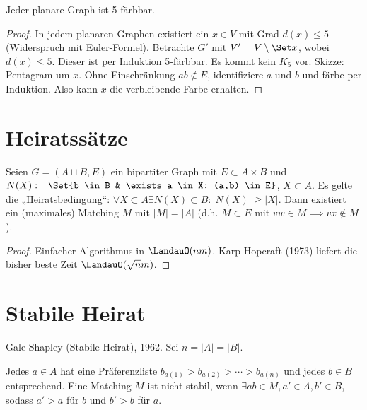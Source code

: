 \begin{st}
    Jeder planare Graph ist 5-färbbar.
    \begin{proof}
        In jedem planaren Graphen existiert ein $x \in V$ mit Grad $d(x) \le 5$ (Widerspruch mit Euler-Formel).
        Betrachte $G'$ mit $V' = V \setminus \Set x$, wobei $d(x) \le 5$.
        Dieser ist per Induktion 5-färbbar.
        Es kommt kein $K_5$ vor. Skizze: Pentagram um $x$.
        Ohne Einschränkung $ab \not\in E$, identifiziere $a$ und $b$ und färbe per Induktion.
        Also kann $x$ die verbleibende Farbe erhalten.
    \end{proof}
\end{st}


\section{Heiratssätze}


\begin{st}
    Seien $G = (A \sqcup B, E)$ ein bipartiter Graph mit $E \subset A \times B$ und $N(X) := \Set{b \in B & \exists a \in X: (a,b) \in E}$, $X \subset A$.
    Es gelte die „Heiratsbedingung“:
    \begin{math}
        \forall X \subset A \exists N(X) \subset B : |N(X)| \ge |X|.
    \end{math}
    Dann existiert ein (maximales) Matching $M$ mit $|M| = |A|$ (d.h. $M \subset E$ mit $vw \in M \implies vx \not\in M$).
    \begin{proof}
        Einfacher Algorithmus in $\LandauO(nm)$.
        Karp Hopcraft (1973) liefert die bisher beste Zeit $\LandauO(\sqrt{n} m)$.
    \end{proof}
\end{st}

\section{Stabile Heirat}

Gale-Shapley (Stabile Heirat), 1962.
Sei $n = |A| = |B|$.

Jedes $a \in A$ hat eine Präferenzliste $b_{a(1)} > b_{a(2)} > \dotsb > b_{a(n)}$ und jedes $b \in B$ entsprechend.
Eine Matching $M$ ist nicht stabil, wenn $\exists ab \in M, a' \in A, b' \in B$, sodass $a' > a$ für $b$ und $b' > b$ für $a$.

